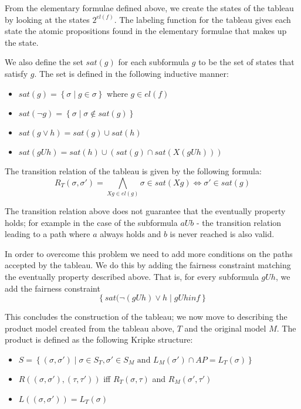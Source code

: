 \documentclass[11pt]{article}
\begin{document}
        From the elementary formulae defined above, we create the states of the
        tableau by looking at the states $2^{el(f)}$. The labeling function for
        the tableau gives each state the atomic propositions found in the 
        elementary formulae that makes up the state.

        We also define the set $sat(g)$ for each subformula $g$ to be the set of
        states that satisfy $g$. The set is defined in the following inductive
        manner:
        \begin{itemize}
            \item 
                $sat(g) = \left\{\sigma \; |\; g\in \sigma\right\}$ where
                $g \in el(f)$

            \item 
                $sat(\neg g) = \left\{\sigma \;|\; \sigma \not\in sat(g)\right\}$

            \item
                $sat(g\vee h) = sat(g) \cup sat(h)$

            \item
                $sat(g U h) = sat(h) \cup (sat(g) \cap sat(X(gUh)))$
        \end{itemize}

        The transition relation of the tableau is given by the following formula:
        \[
            R_T(\sigma, \sigma') = \underset{Xg\in el(g)}{\bigwedge}
                \sigma\in sat(Xg) \iff \sigma' \in sat(g)
        \]

        The transition relation above does not guarantee that the eventually
        property holds; for example in the case of the subformula $aUb$ - the
        transition relation leading to a path where $a$ always holds and $b$ is
        never reached is also valid. 
        
        In order to overcome this problem we need to add more conditions on the
        paths accepted by the tableau. We do this by adding the fairness 
        constraint matching the eventually property described above. 
        That is, for every subformula $gUh$, we add the fairness constraint
        \[
            \left\{sat(\neg(gUh)\vee h \;|\; gUh in f \right\}
        \]

        This concludes the construction of the tableau; we now move to describing
        the product model created from the tableau above, $T$ and the original 
        model $M$. The product is defined as the following Kripke structure:
        \begin{itemize}
            \item
                $S = \left\{(\sigma, \sigma')\;|\; \sigma \in S_T, \sigma' \in S_M
                \text{ and } L_M(\sigma')\cap AP = L_T(\sigma) \right\}$ 
            
            \item
                $R((\sigma, \sigma'), (\tau, \tau'))$ iff $R_T(\sigma, \tau)$
                and $R_M(\sigma', \tau')$

            \item
                $L((\sigma, \sigma')) = L_T(\sigma)$
        \end{itemize}
\end{document}

